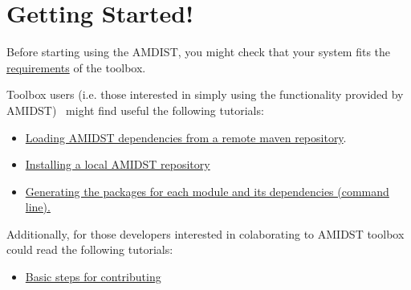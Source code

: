 \documentclass[10pt,a4paper]{report}
\begin{document}
\chapter{Getting Started! }\label{getting-started}

Before starting using the AMDIST, you might check that your system fits
the \href{requirements.html}{requirements} of the toolbox.\newline 

Toolbox users (i.e. those interested in simply using the functionality
provided by AMIDST)~ might find useful the following tutorials:

\begin{itemize}
	\item
	\href{remoteDeps.html}{Loading AMIDST dependencies from a remote maven
		repository}.
	\item \href{localDeps.html}{Installing a local AMIDST repository}
	\item \href{copydep.html}{Generating the packages for each module and its
		dependencies (command line).}
\end{itemize}

Additionally, for those developers interested in colaborating to AMIDST toolbox could read the following tutorials:

\begin{itemize}
	\item \href{amidst_team_modifications.html}{Basic steps for contributing}
\end{itemize}
\end{document}
